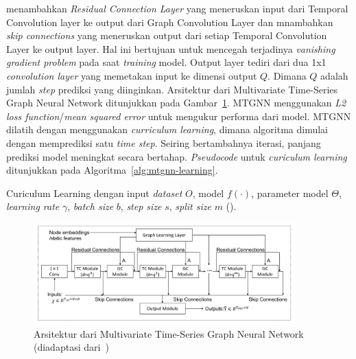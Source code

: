 \cite{Wu2020} menambahkan \textit{Residual Connection Layer} yang meneruskan input dari Temporal Convolution layer ke output dari Graph Convolution Layer dan mnambahkan \textit{skip connections} yang meneruskan output dari setiap Temporal Convolution Layer ke output layer. Hal ini bertujuan untuk mencegah terjadinya \textit{vanishing gradient problem} pada saat \textit{training} model. Output layer tediri dari dua 1x1 \textit{convolution layer} yang memetakan input ke dimensi output $Q$. Dimana $Q$ adalah jumlah \textit{step} prediksi yang diinginkan. Arsitektur dari Multivariate Time-Series Graph Neural Network ditunjukkan pada Gambar~\ref{fig:mtgnn-architecture}. MTGNN menggunakan \textit{L2 loss function}/\textit{mean squared error} untuk mengukur performa dari model. MTGNN dilatih dengan menggunakan \textit{curriculum learning}, dimana algoritma dimulai dengan memprediksi satu \textit{time step}. Seiring bertambahnya iterasi, panjang prediksi model meningkat secara bertahap. \textit{Pseudocode} untuk \textit{curiculum learning} ditunjukkan pada Algoritma~\ref{alg:mtgnn-learning}.


\begin{algorithm}
\caption{Curiculum Learning dengan input \textit{dataset} $O$, model $f(\cdot)$, parameter model $\Theta$, \textit{learning rate} $\gamma$, \textit{batch size} $b$, \textit{step size} $s$, \textit{split size} $m$ (\cite{Wu2020}).}
\label{alg:mtgnn-learning}
\end{algorithm}

\begin{figure}[H]
    \centering
    \includegraphics[width=0.9\textwidth]{figures/mtgnn.png}
    \caption{Arsitektur dari Multivariate Time-Series Graph Neural Network (diadaptasi dari~\cite{Wu2020})}
    \label{fig:mtgnn-architecture}
\end{figure}
